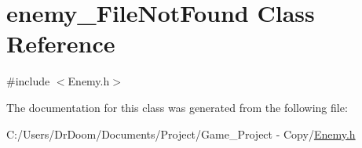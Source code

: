 \hypertarget{classenemy___file_not_found}{}\section{enemy\+\_\+\+File\+Not\+Found Class Reference}
\label{classenemy___file_not_found}


{\ttfamily \#include $<$Enemy.\+h$>$}



The documentation for this class was generated from the following file\+:\begin{DoxyCompactItemize}
\item 
C\+:/\+Users/\+Dr\+Doom/\+Documents/\+Project/\+Game\+\_\+\+Project -\/ Copy/\hyperlink{_enemy_8h}{Enemy.\+h}\end{DoxyCompactItemize}
